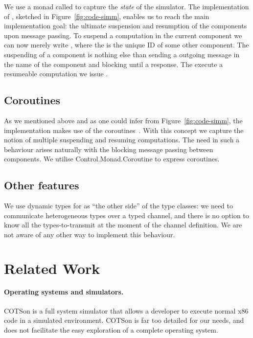 We use a monad called  to capture the \emph{state} of the simulator.
The implementation of , sketched in Figure~\ref{fig:code-simm}, enables us to reach the main implementation goal: the ultimate suspension and resumption of the components upon message passing.
To suspend a computation in the current component we can now merely write , where the  is the unique ID of some other component.
The suspending of a component is nothing else than sending a outgoing message in the name of the component and blocking until a response.
The execute a resumeable computation we issue .


\subsection{Coroutines}
\label{sec:impl-coroutines}
As we mentioned above and as one could infer from Figure~\ref{fig:code-simm}, the implementation makes use of the coroutines~\cite{coroutines}.
With this concept we capture the notion of multiple suspending and resuming computations.
The need in such a behaviour arises naturally with the blocking message passing between components.
We utilise \textsf{Control.Monad.Coroutine} \cite{cmt} to express coroutines.

\subsection{Other features}
We use dynamic types \cite{Abadi:1991:DTS:103135.103138} for as ``the other side'' of the type classes: we need to communicate heterogeneous types over a typed channel, and there is no option to know all the types-to-transmit at the moment of the channel definition.
We are not aware of any other way to implement this behaviour.

\section{Related Work}
\label{sec:related-work}

\paragraph{Operating systems and simulators.}
COTSon \cite{cotson} is a full system simulator that allows a developer to execute normal x86 code in a simulated environment.
COTSon is far too detailed for our needs, and does not facilitate the easy exploration of a complete operating system.

